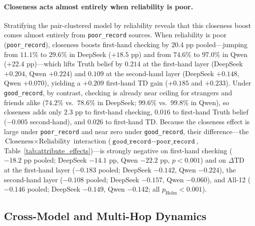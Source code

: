 \documentclass[letterpaper]{article} %
\begin{document}
\paragraph{Closeness acts almost entirely when reliability is poor.}
Stratifying the pair-clustered model by reliability reveals that this closeness boost comes almost entirely from \texttt{poor\_record} sources. When reliability is poor (\texttt{poor\_record}), closeness boosts first-hand checking by $20.4\text{ pp}$ pooled---jumping from $11.1\%$ to $29.6\%$ in DeepSeek ($+18.5\text{ pp}$) and from $74.6\%$ to $97.0\%$ in Qwen ($+22.4\text{ pp}$)---which lifts Truth belief by $0.214$ at the first-hand layer (DeepSeek $+0.204$, Qwen $+0.224$) and $0.109$ at the second-hand layer (DeepSeek $+0.148$, Qwen $+0.070$), yielding a $+0.209$ first-hand TD gain ($+0.185$ and $+0.233$). Under \texttt{good\_record}, by contrast, checking is already near ceiling for strangers and friends alike ($74.2\%$ vs.\ $78.6\%$ in DeepSeek; $99.6\%$ vs.\ $99.8\%$ in Qwen), so closeness adds only $2.3\text{ pp}$ to first-hand checking, $0.016$ to first-hand Truth belief ($-0.005$ second-hand), and $0.026$ to first-hand TD. Because the closeness effect is large under \texttt{poor\_record} and near zero under \texttt{good\_record}, their difference---the $\text{Closeness} \times \text{Reliability}$ interaction ($\texttt{good\_record} - \texttt{poor\_record}$, Table~\ref{tab:attribute_effects})---is strongly negative on first-hand checking ($-18.2\text{ pp}$ pooled; DeepSeek $-14.1\text{ pp}$, Qwen $-22.2\text{ pp}$, $p < 0.001$) and on $\Delta\text{TD}$ at the first-hand layer ($-0.183$ pooled; DeepSeek $-0.142$, Qwen $-0.224$), the second-hand layer ($-0.108$ pooled; DeepSeek $-0.157$, Qwen $-0.060$), and All-12 ($-0.146$ pooled; DeepSeek $-0.149$, Qwen $-0.142$; all $p_{\text{Holm}} < 0.001$).

\subsection{Cross-Model and Multi-Hop Dynamics}
\label{sec:pillar3}
\end{document}
